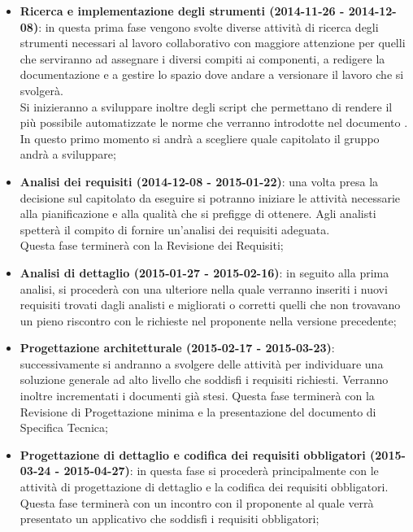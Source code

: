 		\begin{itemize}
			\item \textbf{Ricerca e implementazione degli strumenti (2014-11-26 - 2014-12-08)}: in questa prima fase vengono svolte diverse attività di ricerca degli strumenti necessari al lavoro collaborativo con maggiore attenzione per quelli che serviranno ad assegnare i diversi compiti ai componenti, a redigere la documentazione e a gestire lo spazio dove andare a versionare il lavoro che si svolgerà. \\
			Si inizieranno a sviluppare inoltre degli script che permettano di rendere il più possibile automatizzate le norme che verranno introdotte nel documento \docNameVersionNdP. \\
			In questo primo momento si andrà a scegliere quale capitolato il gruppo andrà a sviluppare;

			\item \textbf{Analisi dei requisiti (2014-12-08 - 2015-01-22)}: una volta presa la decisione sul capitolato da eseguire si potranno iniziare le attività necessarie alla pianificazione e alla qualità che si prefigge di ottenere.
			Agli analisti spetterà il compito di fornire un'analisi dei requisiti adeguata.\\
			Questa fase terminerà con la Revisione dei Requisiti;

			\item \textbf{Analisi di dettaglio (2015-01-27 - 2015-02-16)}: in seguito alla prima analisi, si procederà con una ulteriore nella quale verranno inseriti i nuovi requisiti trovati dagli analisti e migliorati o corretti quelli che non trovavano un pieno riscontro con le richieste nel proponente nella versione precedente;
			
			\item \textbf{Progettazione architetturale (2015-02-17 - 2015-03-23)}: successivamente si andranno a svolgere delle attività per individuare una soluzione generale ad alto livello che soddisfi i requisiti richiesti. Verranno inoltre incrementati i documenti già stesi. Questa fase terminerà con la Revisione di Progettazione minima e la presentazione del documento di Specifica Tecnica;

			\item \textbf{Progettazione di dettaglio e codifica dei requisiti obbligatori (2015-03-24 - 2015-04-27)}: in questa fase si procederà principalmente con le attività di progettazione di dettaglio e la codifica dei requisiti obbligatori. Questa fase terminerà con un incontro con il proponente al quale verrà presentato un applicativo che soddisfi i requisiti obbligatori;
			

\end{itemize}
